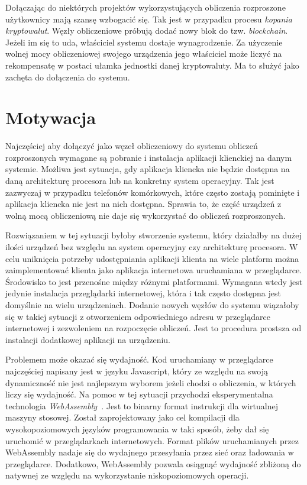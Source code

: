 \documentclass[a4paper,11pt,twoside]{report}
\theoremstyle{definition}
\begin{document}
    Dołączając do niektórych projektów wykorzystujących obliczenia rozproszone użytkownicy mają szansę wzbogacić się.
    Tak jest w przypadku procesu \textit{kopania kryptowalut}.
    Węzły obliczeniowe próbują dodać nowy blok do tzw. \textit{blockchain}.
    Jeżeli im się to uda, właściciel systemu dostaje wynagrodzenie.
    Za użyczenie wolnej mocy obliczeniowej swojego urządzenia jego właściciel może liczyć na rekompensatę w postaci ułamka jednostki danej kryptowaluty.
    Ma to służyć jako zachęta do dołączenia do systemu.
    
    \section{Motywacja}
    
    Najczęściej aby dołączyć jako węzeł obliczeniowy do systemu obliczeń rozproszonych wymagane są
    pobranie i instalacja aplikacji klienckiej na danym systemie.
    Możliwa jest sytuacja, gdy aplikacja kliencka nie będzie dostępna na daną architekturę procesora
    lub na konkretny system operacyjny.
    Tak jest zazwyczaj w przypadku telefonów komórkowych, które często zostają pominięte i aplikacja
    kliencka nie jest na nich dostępna.
    Sprawia to, że część urządzeń z wolną mocą obliczeniową nie daje się wykorzystać do obliczeń
    rozproszonych.
    
    Rozwiązaniem w tej sytuacji byłoby stworzenie systemu, który działałby na dużej ilości urządzeń
    bez względu na system operacyjny czy architekturę procesora.
    W celu uniknięcia potrzeby udostępniania aplikacji klienta na wiele platform można zaimplementować
    klienta jako aplikacja internetowa uruchamiana w przeglądarce. Środowisko to jest przenośne
    między różnymi platformami. Wymagana wtedy jest jedynie instalacja przeglądarki internetowej,
    która i tak często dostępna jest domyślnie na wielu urządzeniach.
    Dodanie nowych węzłów do systemu wiązałoby się w takiej sytuacji z otworzeniem odpowiedniego
    adresu w przeglądarce internetowej i zezwoleniem na rozpoczęcie obliczeń.
    Jest to procedura prostsza od instalacji dodatkowej aplikacji na urządzeniu.
    
    Problemem może okazać się wydajność. Kod uruchamiany w przeglądarce najczęściej napisany
    jest w języku {Javascript}, który ze względu na swoją dynamiczność nie jest najlepszym wyborem
    jeżeli chodzi o obliczenia, w których liczy się wydajność. Na pomoc w tej sytuacji przychodzi
    eksperymentalna technologia \textit{WebAssembly}~\cite{webassembly-goals}.
    Jest to binarny format instrukcji dla wirtualnej maszyny stosowej.
    Został zaprojektowany jako cel kompilacji dla wysokopoziomowych języków programowania
    w taki sposób, żeby dał się uruchomić w przeglądarkach internetowych.
    Format plików uruchamianych przez WebAssembly nadaje się do wydajnego przesyłania przez sieć
    oraz ładowania w przeglądarce.
    Dodatkowo, WebAssembly pozwala osiągnąć wydajność zbliżoną do natywnej ze względu na wykorzystanie
    niskopoziomowych operacji.
    
\end{document}
